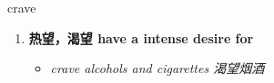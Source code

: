 
\begin{frame}
{\huge crave}
\begin{center}
\begin{enumerate}\Large
  \item \textbf{热望，渴望 have a intense desire for}
  \begin{itemize}
    \item \em{\Large{crave alcohols and cigarettes 渴望烟酒}}
  \end{itemize}
\end{enumerate}
\end{center}
\end{frame}
